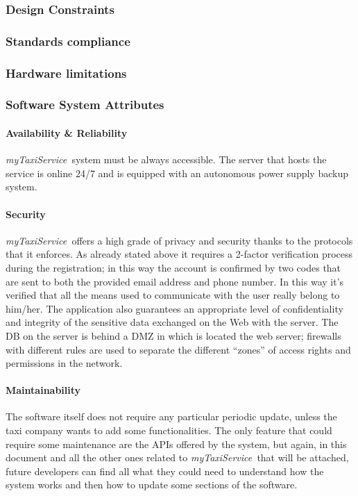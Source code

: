 \documentclass[a4paper,11pt]{report} %
\newcommand{\mts}{\mbox{\normalfont\itshape myTaxiService\ }}
\begin{document}
	\subsubsection{Design Constraints}
		
	\subsubsection{Standards compliance}
	
	\subsubsection{Hardware limitations}
	
	\subsubsection{Software System Attributes}
	
	\paragraph{Availability \& Reliability} \mts system must be always accessible. The server that hosts the service is online 24/7 and is equipped with an autonomous power supply backup system.
	
	\paragraph{Security} \mts offers a high grade of privacy and security thanks to the protocols that it enforces. As already stated above it requires a 2-factor verification process during the registration; in this way the account is confirmed by two codes that are sent to both the provided email address and phone number. In this way it's verified that  all the means used to communicate with the user really belong to him/her. The application also guarantees an appropriate level of confidentiality and integrity of the sensitive data exchanged on the Web with the server. The DB on the server is behind a DMZ in which is located the web server; firewalls with different rules are used to separate the different ``zones'' of access rights and permissions in the network.
	
	\paragraph{Maintainability} The software itself does not require any particular periodic update, unless the taxi company wants to add some functionalities. The only feature that could require some maintenance are the APIs offered by the system, but again, in this document and all the other ones related to \mts that will be attached, future developers can find all what they could need to understand how the system works and then how to update some sections of the software. 
\end{document}
